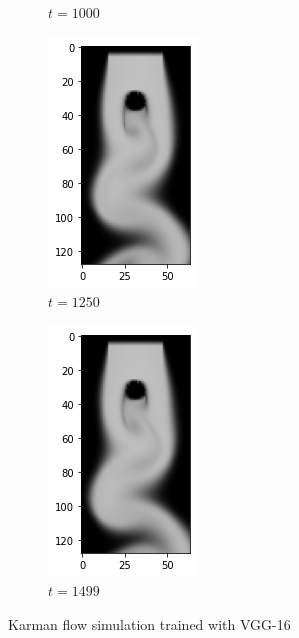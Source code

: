 \documentclass[a4paper,12pt,twoside]{report}
\begin{document}
\begin{figure}
\begin{subfigure}{0.18\textwidth}
		\caption{$t=1000$}
	\end{subfigure}
	\begin{subfigure}{0.18\textwidth}
		\centering
		\includegraphics[scale=0.5]{karmanflow/vgg_density_001250.png}
		\caption{$t=1250$}
	\end{subfigure}
	\begin{subfigure}{0.18\textwidth}
		\centering
		\includegraphics[scale=0.5]{karmanflow/vgg_density_001499.png}
		\caption{$t=1499$}
	\end{subfigure}
	\caption{Karman flow simulation trained with VGG-16}
\end{figure}
\end{document}
